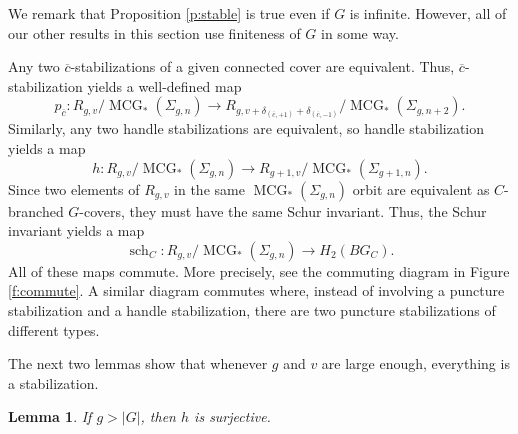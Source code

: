 \documentclass[10pt,twocolumn,amsmath,amssymb,aps,pra,secnumarabic,
    nofootinbib,groupedaddress]{revtex4-1}
\newtheorem{lemma}[theorem]{Lemma}
\newcommand{\MCG}{\operatorname{MCG}}
\newcommand{\sch}{\operatorname{sch}}
\begin{document}
We remark that Proposition \ref{p:stable} is true even if $G$ is infinite.  However, all of our other results in this section use finiteness of $G$ in some way.

Any two $\overline{c}$-stabilizations of a given connected cover are equivalent.  Thus, $\overline{c}$-stabilization yields a well-defined map
\[ p_{\overline{c}}: R_{g,v}/\MCG_*(\Sigma_{g,n}) \to R_{g,v + \delta_{(\overline{c},+1)} + \delta_{(\overline{c},-1)}} / \MCG_*(\Sigma_{g,n+2}). \]
Similarly, any two handle stabilizations are equivalent, so handle stabilization yields a map
\[ h: R_{g,v}/\MCG_*(\Sigma_{g,n}) \to R_{g+1,v}/\MCG_*(\Sigma_{g+1,n}). \]
Since two elements of $R_{g,v}$ in the same $\MCG_*(\Sigma_{g,n})$ orbit are equivalent as $C$-branched $G$-covers, they must have the same Schur invariant.  Thus, the Schur invariant yields a map
\[ \sch_C: R_{g,v}/\MCG_*(\Sigma_{g,n}) \to H_2(BG_C). \]
All of these maps commute.  More precisely, see the commuting diagram in Figure \ref{f:commute}.  A similar diagram commutes where, instead of involving a puncture stabilization and a handle stabilization, there are two puncture stabilizations of different types.

\begin{figure*}[t]
\caption{The diagram commutes.}
\label{f:commute}
\end{figure*}

The next two lemmas show that whenever $g$ and $v$ are large enough, everything is a stabilization.

\begin{lemma}
If $g>|G|$, then $h$ is surjective.
\label{l:handle}
\end{lemma}
\end{document}
